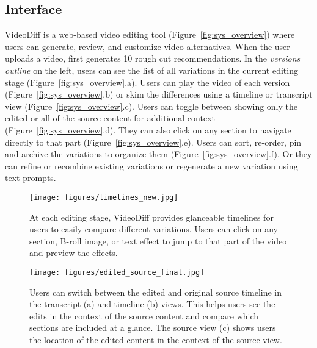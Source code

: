 \subsection{Interface}
VideoDiff is a web-based video editing tool (Figure~\ref{fig:sys_overview}) where users can generate, review, and customize video alternatives. 
When the user uploads a video, \sysname{} first generates 10 rough cut recommendations. In the \textit{versions outline} on the left, users can see the list of all variations in the current editing stage (Figure~\ref{fig:sys_overview}.a). Users can play the video of each version (Figure~\ref{fig:sys_overview}.b) or skim the differences using a timeline or transcript view (Figure~\ref{fig:sys_overview}.c).  Users can toggle between showing only the edited or all of the source content for additional context (Figure~\ref{fig:sys_overview}.d).  They can also click on any section to navigate directly to that part (Figure~\ref{fig:sys_overview}.e).
%
Users can sort, re-order, pin and archive the variations to organize them (Figure~\ref{fig:sys_overview}.f). Or they can refine or recombine existing variations or regenerate a new variation using text prompts. 

\begin{figure}[t]
  \centering
  \texttt{[image: figures/timelines\_new.jpg]}
  \caption{At each editing stage, VideoDiff provides glanceable timelines for users to easily compare different variations. Users can click on any section, B-roll image, or text effect to jump to that part of the video and preview the effects.}\label{fig:timelines}
\end{figure}

\begin{figure*}
  \centering
  \texttt{[image: figures/edited\_source\_final.jpg]}
  \caption{Users can switch between the edited and original source timeline in the transcript (a) and timeline (b) views. This helps users see the edits in the context of the source content and compare which sections are included at a glance. The source view (c) shows users the location of the edited content in the context of the source view.}\label{fig:extracted_original}
\end{figure*}


